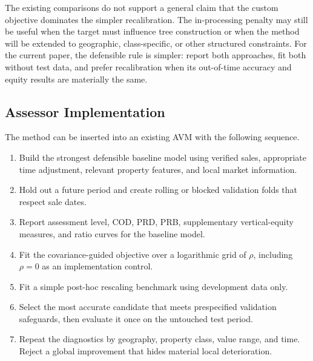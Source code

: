 \documentclass[10pt]{article}
\theoremstyle{definition}
\newcommand{\1}{\mathbf{1}}
\begin{document}
{{The existing comparisons do not support a general claim that the custom objective dominates the simpler recalibration. The in-processing penalty may still be useful when the target must influence tree construction or when the method will be extended to geographic, class-specific, or other structured constraints. For the current paper, the defensible rule is simpler: report both approaches, fit both without test data, and prefer recalibration when its out-of-time accuracy and equity results are materially the same.

\subsection{Assessor Implementation}
\label{sec:implementation_workflow}

The method can be inserted into an existing AVM with the following sequence.

\begin{enumerate}[leftmargin=7mm]
    \item Build the strongest defensible baseline model using verified sales, appropriate time adjustment, relevant property features, and local market information.
    \item Hold out a future period and create rolling or blocked validation folds that respect sale dates.
    \item Report assessment level, COD, PRD, PRB, supplementary vertical-equity measures, and ratio curves for the baseline model.
    \item Fit the covariance-guided objective over a logarithmic grid of $\rho$, including $\rho=0$ as an implementation control.
    \item Fit a simple post-hoc rescaling benchmark using development data only.
    \item Select the most accurate candidate that meets prespecified validation safeguards, then evaluate it once on the untouched test period.
    \item Repeat the diagnostics by geography, property class, value range, and time. Reject a global improvement that hides material local deterioration.
\end{enumerate}

}}
\end{document}
